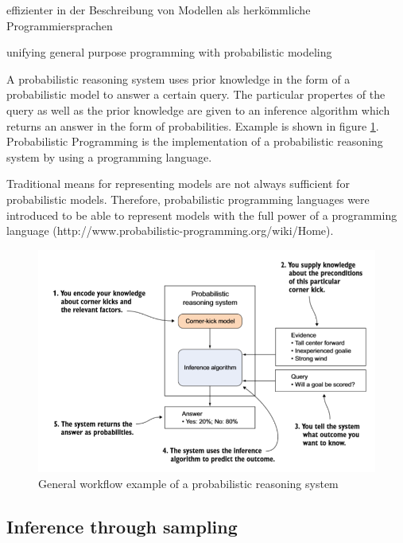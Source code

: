 \documentclass{article}
\begin{document}
\cite{wiki:Probabilisticprogramminglanguage}

effizienter in der Beschreibung von Modellen als herkömmliche Programmiersprachen \cite{Hardesty2015}

unifying general purpose programming with probabilistic modeling \cite{probabilistic-programming.org}


A \gls{probabilistic reasoning system} uses prior knowledge in the form of a \gls{probabilistic model} to answer a certain query. The particular propertes of the query as well as the prior knowledge are given to an \gls{inference algorithm} which returns an answer in the form of probabilities. Example is shown in figure \ref{fig:example_prs}. Probabilistic Programming is the implementation of a \gls{probabilistic reasoning system} by using a programming language.

Traditional means for representing models are not always sufficient for probabilistic models. Therefore, probabilistic programming languages were introduced to be able to represent models with the full power of a programming language (http://www.probabilistic-programming.org/wiki/Home).


\begin{figure}
	\includegraphics[width=\textwidth]{images/probabilistic_reasoning_system.PNG}
	\caption[General workflow example of a probabilistic reasoning system. Source: \cite{9781617292330}]{General workflow example of a probabilistic reasoning system}
	\label{fig:example_prs}
\end{figure}

\subsection{Inference through sampling}
\end{document}
